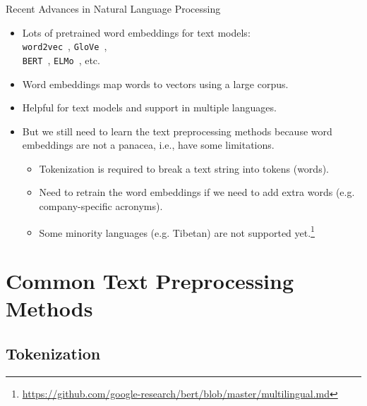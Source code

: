 \documentclass{beamer}
\renewcommand{\cite}{\citep}
\begin{document}
\begin{frame}{Recent Advances in Natural Language Processing}
\begin{itemize}
\item Lots of pretrained word embeddings for text models:\\
\texttt{word2vec}~\cite{mikolov2013efficient}, \texttt{GloVe}~\cite{pennington2014glove}, \\
\texttt{BERT}~\cite{devlin2018bert}, \texttt{ELMo}~\cite{peters2018deep}, etc.
\item Word embeddings map words to vectors using a large corpus.
\item Helpful for text models and support in multiple languages.
	\bigskip
\item But we still need to learn the text preprocessing methods because word embeddings are not a panacea, i.e., have some limitations.
	\begin{itemize}
	\item Tokenization is required to break a text string into tokens (words).
	\item Need to retrain the word embeddings if we need to add extra words (e.g. company-specific acronyms).~\cite{wilson2020urban}
	\item Some minority languages (e.g. Tibetan) are not supported yet.\footnote{\url{https://github.com/google-research/bert/blob/master/multilingual.md}}
	\end{itemize}
\end{itemize}
\end{frame}

\section{Common Text Preprocessing Methods} %


\subsection{Tokenization}
\end{document}

